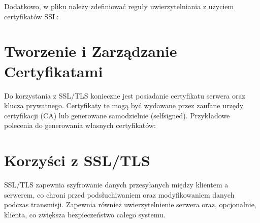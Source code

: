 \documentclass[letterpaper,10pt,polish]{sphinxmanual}
\begin{document}
\sphinxAtStartPar
Dodatkowo, w pliku  należy zdefiniować reguły
uwierzytelniania z użyciem certyfikatów SSL:

\begin{sphinxVerbatim}[commandchars=\\\{\}]
    
\end{sphinxVerbatim}


\section{Tworzenie i Zarządzanie Certyfikatami}
\label{\detokenize{sprawozdanie/source/rozdzialy/rozdzial4:tworzenie-i-zarzadzanie-certyfikatami}}
\sphinxAtStartPar
Do korzystania z SSL/TLS konieczne jest posiadanie certyfikatu serwera
oraz klucza prywatnego. Certyfikaty te mogą być wydawane przez zaufane
urzędy certyfikacji (CA) lub generowane samodzielnie (self\sphinxhyphen{}signed).
Przykładowe polecenia do generowania własnych certyfikatów:

\begin{sphinxVerbatim}[commandchars=\\\{\}]
     
      
          
\end{sphinxVerbatim}


\section{Korzyści z SSL/TLS}
\label{\detokenize{sprawozdanie/source/rozdzialy/rozdzial4:korzysci-z-ssl-tls}}
\sphinxAtStartPar
SSL/TLS zapewnia szyfrowanie danych przesyłanych między klientem a
serwerem, co chroni przed podsłuchiwaniem oraz modyfikowaniem danych
podczas transmisji. Zapewnia również uwierzytelnienie serwera oraz,
opcjonalnie, klienta, co zwiększa bezpieczeństwo całego systemu.
\end{document}
